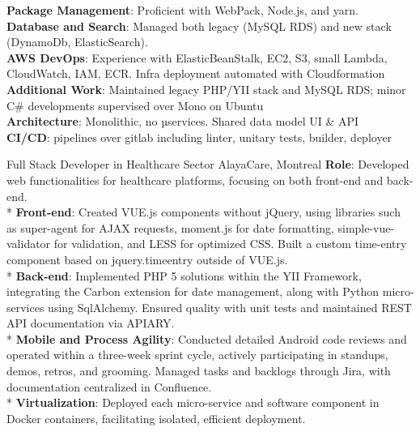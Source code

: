 \documentclass[
  a4paper,
   maincolor=cvblue,
   sectioncolor=cvblue,
]{fortysecondscv}
\begin{document}
\begin{cvtable}
{      \textbf{Package Management}: Proficient with WebPack, Node.js, and yarn.\\
      \textbf{Database and Search}: Managed both legacy (MySQL RDS) and new stack (DynamoDb, ElasticSearch).\\
      \textbf{AWS DevOps}: Experience with ElasticBeanStalk, EC2, S3, small Lambda, CloudWatch, IAM, ECR. Infra deployment automated with Cloudformation\\
      \textbf{Additional Work}: Maintained legacy PHP/YII stack and MySQL RDS; minor C\# developments supervised over Mono on Ubuntu\\
      \textbf{Architecture}: Monolithic, no µservices. Shared data model UI \& API\\
      \textbf{CI/CD}: pipelines over gitlab including linter, unitary tests, builder, deployer
    }
\end{cvtable}







\newpage
\makebacksidebar



\begin{cvtable}
    {Full Stack Developer in Healthcare Sector}
    {AlayaCare, Montreal}
    {
      \textbf{Role}: Developed web functionalities for healthcare platforms, focusing on both front-end and back-end.\\
      * \textbf{Front-end}: Created VUE.js components without jQuery, using libraries such as super-agent for AJAX requests, moment.js for date formatting, simple-vue-validator for validation, and LESS for optimized CSS. Built a custom time-entry component based on jquery.timeentry outside of VUE.js.\\
      * \textbf{Back-end}: Implemented PHP 5 solutions within the YII Framework, integrating the Carbon extension for date management, along with Python micro-services using SqlAlchemy. Ensured quality with unit tests and maintained REST API documentation via APIARY.\\
      * \textbf{Mobile and Process Agility}: Conducted detailed Android code reviews and operated within a three-week sprint cycle, actively participating in standups, demos, retros, and grooming. Managed tasks and backlogs through Jira, with documentation centralized in Confluence.\\
      * \textbf{Virtualization}: Deployed each micro-service and software component in Docker containers, facilitating isolated, efficient deployment.\\
    }
\end{cvtable}
\end{document}
